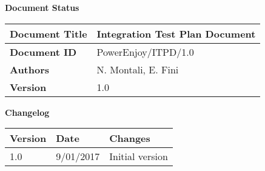 \textbf{\Huge Document Status}
\begin{center}
    \begin{tabular}{ | l | p{10cm} |}
    \hline
    \textbf{Document Title} & Integration Test Plan Document \\ \hline
    \textbf{Document ID} & PowerEnjoy/ITPD/1.0 \\ \hline
    \textbf{Authors} & N. Montali, E. Fini \\ \hline
    \textbf{Version} & 1.0 \\ \hline
    \end{tabular}
\textbf{\Large Changelog}
     \begin{tabular}{ | l | l | p{10cm} |}
    \hline
    \textbf{Version} & \textbf{Date} & \textbf{Changes} \\ \hline
    1.0 & 9/01/2017 & Initial version \\ \hline
    \end{tabular}
\end{center}